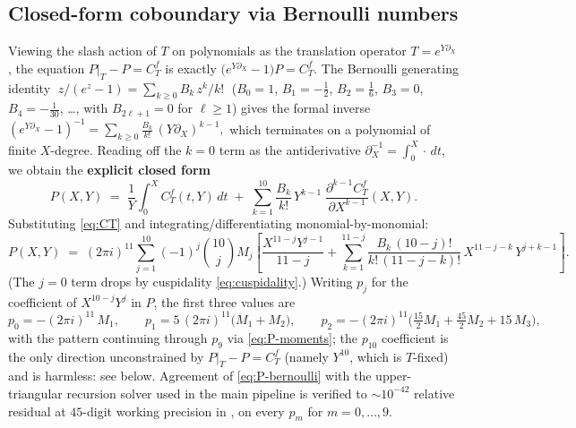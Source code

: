 \documentclass[11pt,letterpaper]{article}
\begin{document}
\subsection{Closed-form coboundary via Bernoulli numbers}

Viewing the slash action of $T$ on polynomials as the translation operator
$T = e^{Y\partial_X}$, the equation $P\big|_T - P = C_T^f$ is exactly
$\bigl(e^{Y\partial_X} - 1\bigr)P = C_T^f$.  The Bernoulli generating identity
\(\;z/(e^z - 1) = \sum_{k\ge 0} B_k\,z^k/k!\;\)
($B_0 = 1$, $B_1 = -\tfrac12$, $B_2 = \tfrac16$, $B_3 = 0$, $B_4 = -\tfrac{1}{30}$,
\ldots, with $B_{2\ell+1} = 0$ for $\ell \ge 1$) gives the formal inverse
\(
  (e^{Y\partial_X} - 1)^{-1} = \sum_{k\ge 0}\frac{B_k}{k!}\,(Y\partial_X)^{k-1},
\)
which terminates on a polynomial of finite $X$-degree.  Reading off the $k=0$
term as the antiderivative $\partial_X^{-1} = \int_0^X\!\cdot\,dt$, we obtain
the \textbf{explicit closed form}
\begin{equation}\label{eq:P-bernoulli}
  \boxed{\;P(X,Y)
    \;=\; \frac{1}{Y}\!\int_0^X\! C_T^f(t, Y)\,dt
    \;+\; \sum_{k=1}^{10}\frac{B_k}{k!}\,Y^{k-1}\;\frac{\partial^{k-1} C_T^f}{\partial X^{k-1}}(X,Y).\;}
\end{equation}
Substituting \eqref{eq:CT} and integrating/differentiating monomial-by-monomial:
\begin{equation}\label{eq:P-moments}
  P(X,Y) \;=\; (2\pi i)^{11}\sum_{j=1}^{10}(-1)^j\binom{10}{j}M_j
    \!\left[\frac{X^{11-j}Y^{j-1}}{11-j}
    + \!\sum_{k=1}^{11-j}\frac{B_k\,(10-j)!}{k!\,(11-j-k)!}\,X^{11-j-k}\,Y^{j+k-1}\right]\!.
\end{equation}
(The $j=0$ term drops by cuspidality \eqref{eq:cuspidality}.)
Writing $p_j$ for the coefficient of $X^{10-j}Y^j$ in $P$, the first three
values are
\begin{equation}\label{eq:p-explicit}
  p_0 = -(2\pi i)^{11}\,M_1, \qquad
  p_1 = 5\,(2\pi i)^{11}\bigl(M_1 + M_2\bigr), \qquad
  p_2 = -(2\pi i)^{11}\bigl(\tfrac{15}{2}M_1 + \tfrac{45}{2}M_2 + 15\,M_3\bigr),
\end{equation}
with the pattern continuing through $p_9$ via \eqref{eq:P-moments}; the $p_{10}$
coefficient is the only direction unconstrained by $P\big|_T - P = C_T^f$ (namely
$Y^{10}$, which is $T$-fixed) and is harmless: see below.  Agreement of
\eqref{eq:P-bernoulli} with the upper-triangular recursion solver used in
the main pipeline is verified to $\sim 10^{-42}$ relative residual at
$45$-digit working precision in \cite{VerifyBernoulli}, on every $p_m$ for
$m = 0, \ldots, 9$.
\end{document}
